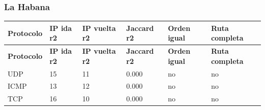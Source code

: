 \subsubsection{La Habana}
\begingroup
\fontsize{9}{11}\selectfont
\addtocounter{table}{-1}
\begin{longtable}{p{2.1cm}p{1.7cm}p{2cm}p{2cm}p{2.2cm}p{2.7cm}}
\toprule
\textbf{Protocolo} & \textbf{IP ida r2} & \textbf{IP vuelta r2} & \textbf{Jaccard r2} & \textbf{Orden igual} & \textbf{Ruta completa} \\ \midrule
\endfirsthead
\toprule
\textbf{Protocolo} & \textbf{IP ida r2} & \textbf{IP vuelta r2} & \textbf{Jaccard r2} & \textbf{Orden igual} & \textbf{Ruta completa} \\ \midrule
\endhead
UDP & 15 & 11 & 0.000 & no & no \\
ICMP & 13 & 12 & 0.000 & no & no \\
TCP & 16 & 10 & 0.000 & no & no \\
\bottomrule
\end{longtable}
\endgroup
\begingroup
\fontsize{9}{11}\selectfont
